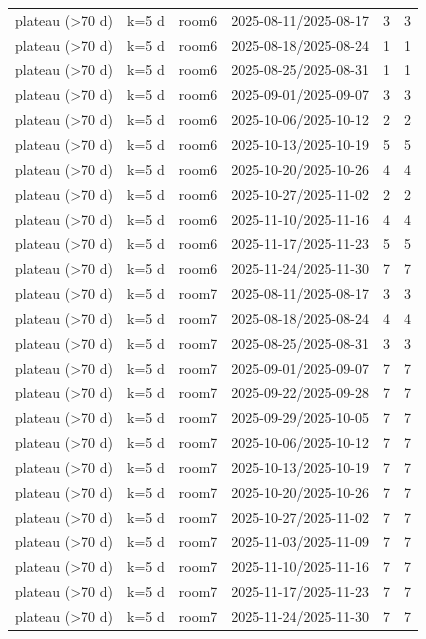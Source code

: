 \begin{tabular}{llllll}
plateau (>70 d) & k=5 d & room6 & 2025-08-11/2025-08-17 & 3 & 3 \\
plateau (>70 d) & k=5 d & room6 & 2025-08-18/2025-08-24 & 1 & 1 \\
plateau (>70 d) & k=5 d & room6 & 2025-08-25/2025-08-31 & 1 & 1 \\
plateau (>70 d) & k=5 d & room6 & 2025-09-01/2025-09-07 & 3 & 3 \\
plateau (>70 d) & k=5 d & room6 & 2025-10-06/2025-10-12 & 2 & 2 \\
plateau (>70 d) & k=5 d & room6 & 2025-10-13/2025-10-19 & 5 & 5 \\
plateau (>70 d) & k=5 d & room6 & 2025-10-20/2025-10-26 & 4 & 4 \\
plateau (>70 d) & k=5 d & room6 & 2025-10-27/2025-11-02 & 2 & 2 \\
plateau (>70 d) & k=5 d & room6 & 2025-11-10/2025-11-16 & 4 & 4 \\
plateau (>70 d) & k=5 d & room6 & 2025-11-17/2025-11-23 & 5 & 5 \\
plateau (>70 d) & k=5 d & room6 & 2025-11-24/2025-11-30 & 7 & 7 \\
plateau (>70 d) & k=5 d & room7 & 2025-08-11/2025-08-17 & 3 & 3 \\
plateau (>70 d) & k=5 d & room7 & 2025-08-18/2025-08-24 & 4 & 4 \\
plateau (>70 d) & k=5 d & room7 & 2025-08-25/2025-08-31 & 3 & 3 \\
plateau (>70 d) & k=5 d & room7 & 2025-09-01/2025-09-07 & 7 & 7 \\
plateau (>70 d) & k=5 d & room7 & 2025-09-22/2025-09-28 & 7 & 7 \\
plateau (>70 d) & k=5 d & room7 & 2025-09-29/2025-10-05 & 7 & 7 \\
plateau (>70 d) & k=5 d & room7 & 2025-10-06/2025-10-12 & 7 & 7 \\
plateau (>70 d) & k=5 d & room7 & 2025-10-13/2025-10-19 & 7 & 7 \\
plateau (>70 d) & k=5 d & room7 & 2025-10-20/2025-10-26 & 7 & 7 \\
plateau (>70 d) & k=5 d & room7 & 2025-10-27/2025-11-02 & 7 & 7 \\
plateau (>70 d) & k=5 d & room7 & 2025-11-03/2025-11-09 & 7 & 7 \\
plateau (>70 d) & k=5 d & room7 & 2025-11-10/2025-11-16 & 7 & 7 \\
plateau (>70 d) & k=5 d & room7 & 2025-11-17/2025-11-23 & 7 & 7 \\
plateau (>70 d) & k=5 d & room7 & 2025-11-24/2025-11-30 & 7 & 7 \\

\end{tabular}
